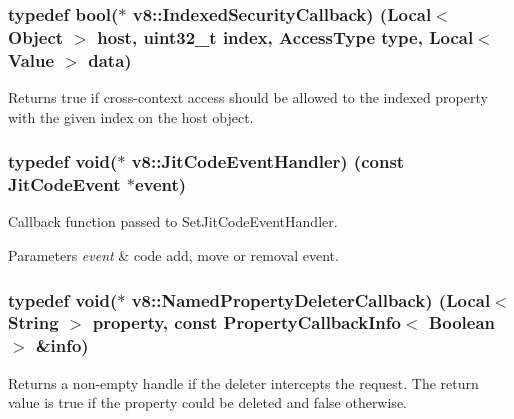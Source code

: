 \subsubsection[{\texorpdfstring{Indexed\+Security\+Callback}{IndexedSecurityCallback}}]{\setlength{\rightskip}{0pt plus 5cm}typedef bool($\ast$ v8\+::\+Indexed\+Security\+Callback) ({\bf Local}$<$ {\bf Object} $>$ host, uint32\+\_\+t index, {\bf Access\+Type} type, {\bf Local}$<$ {\bf Value} $>$ data)}\hypertarget{namespacev8_aebbcc7837753e51112d944ad96520da1}{}\label{namespacev8_aebbcc7837753e51112d944ad96520da1}
Returns true if cross-\/context access should be allowed to the indexed property with the given index on the host object. 
\subsubsection[{\texorpdfstring{Jit\+Code\+Event\+Handler}{JitCodeEventHandler}}]{\setlength{\rightskip}{0pt plus 5cm}typedef void($\ast$ v8\+::\+Jit\+Code\+Event\+Handler) (const {\bf Jit\+Code\+Event} $\ast$event)}\hypertarget{namespacev8_a39243bc91e63d64d111452fdb98c4733}{}\label{namespacev8_a39243bc91e63d64d111452fdb98c4733}
Callback function passed to Set\+Jit\+Code\+Event\+Handler.


\begin{DoxyParams}{Parameters}
{\em event} & code add, move or removal event. \\
\hline
\end{DoxyParams}
\subsubsection[{\texorpdfstring{Named\+Property\+Deleter\+Callback}{NamedPropertyDeleterCallback}}]{\setlength{\rightskip}{0pt plus 5cm}typedef void($\ast$ v8\+::\+Named\+Property\+Deleter\+Callback) ({\bf Local}$<$ {\bf String} $>$ property, const {\bf Property\+Callback\+Info}$<$ {\bf Boolean} $>$ \&info)}\hypertarget{namespacev8_aaba861076c5b111912cfa0791d348437}{}\label{namespacev8_aaba861076c5b111912cfa0791d348437}
Returns a non-\/empty handle if the deleter intercepts the request. The return value is true if the property could be deleted and false otherwise. 
